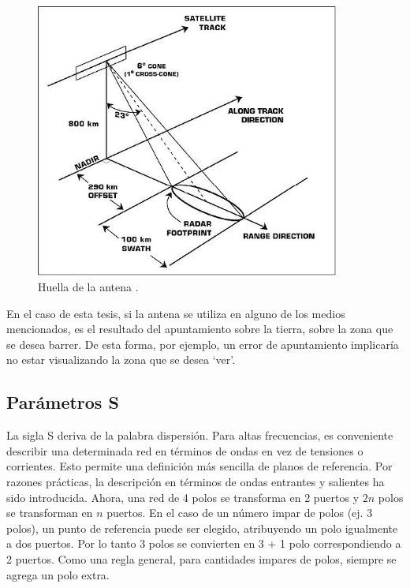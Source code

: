 \begin{figure}[H]
 \centering
 \includegraphics[width=10cm]{gfx/satellite.png}
 \caption{Huella de la antena \cite{FootprintSatellite}.}
 \label{fig:huellaSatellite}
\end{figure}

En el caso de esta tesis, si la antena se utiliza en alguno de los medios mencionados, es el resultado del apuntamiento sobre la
tierra, sobre la zona que se desea barrer. De esta forma, por ejemplo, un error de apuntamiento implicaría no estar visualizando
la zona que se desea \enquote*{ver}.


\subsection{Parámetros S} 

La sigla S deriva de la palabra dispersión. Para altas frecuencias, es conveniente describir una
determinada red en términos de ondas en vez de tensiones o corrientes. Esto permite una definición más sencilla de planos
de referencia. Por razones prácticas, la descripción en términos de ondas entrantes y salientes ha sido introducida. Ahora,
una red de 4 polos se transforma en 2 puertos y $2n$ polos se transforman en $n$ puertos. En el caso de un número impar de polos
(ej. 3 polos), un punto de referencia puede ser elegido, atribuyendo un polo igualmente a dos puertos. Por lo tanto 3 polos se
convierten en 3 + 1 polo correspondiendo a 2 puertos. Como una regla general, para cantidades impares de polos, siempre se agrega
un polo extra.

